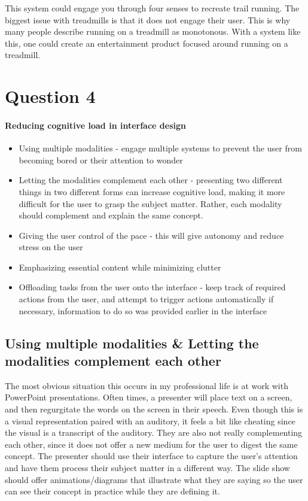 This system could engage you through four senses to recreate trail running. The biggest issue with treadmills is that it does not engage their user. This is why many people describe running on a treadmill as monotonous. With a system like this, one could create an entertainment product focused around running on a treadmill.

\section{Question 4}

\paragraph{Reducing cognitive load in interface design}
\begin{itemize}
\item
  Using multiple modalities - engage multiple systems to prevent the user from becoming bored or their attention to wonder
\item
  Letting the modalities complement each other - presenting two different things in two different forms can increase cognitive load, making it more difficult for the user to grasp the subject matter. Rather, each modality should complement and explain the same concept.
\item
  Giving the user control of the pace - this will give autonomy and reduce stress on the user
\item
  Emphasizing essential content while minimizing clutter
\item
  Offloading tasks from the user onto the interface - keep track of required actions from the user, and attempt to trigger actions automatically if necessary, information to do so was provided earlier in the interface
\end{itemize}

\subsection{Using multiple modalities & Letting the modalities complement each other}
The most obvious situation this occurs in my professional life is at work with PowerPoint presentations. Often times, a presenter will place text on a screen, and then regurgitate the words on the screen in their speech. Even though this is a visual representation paired with an auditory, it feels a bit like cheating since the visual is a transcript of the auditory. They are also not really complementing each other, since it does not offer a new medium for the user to digest the same concept. The presenter should use their interface to capture the user's attention and have them process their subject matter in a different way. The slide show should offer animations/diagrams that illustrate what they are saying so the user can see their concept in practice while they are defining it.

